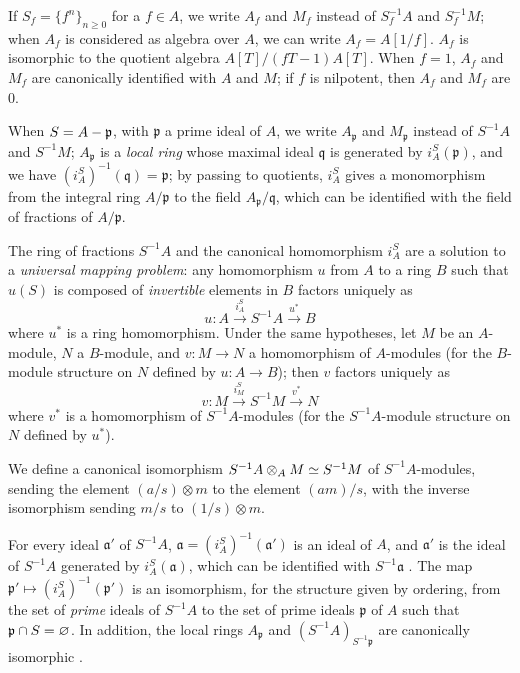 \begin{env}[1.2.3]
\label{0.1.2.3}
If $S_f=\{f^n\}_{n\geq 0}$ for a $f\in A$, we write $A_f$ and $M_f$ instead
of $S_f^{-1}A$ and $S_f^{-1}M$; when $A_f$ is considered as algebra over $A$, we
can write $A_f=A[1/f]$. $A_f$ is isomorphic to the quotient algebra
$A[T]/(fT-1)A[T]$. When $f=1$, $A_f$ and $M_f$ are canonically identified with $A$ and
$M$; if $f$ is nilpotent, then $A_f$ and $M_f$ are $0$.

When $S=A-\mathfrak{p}$, with $\mathfrak{p}$ a prime ideal of $A$, we write
$A_\mathfrak{p}$ and $M_\mathfrak{p}$ instead of $S^{-1}A$ and $S^{-1}M$;
$A_\mathfrak{p}$ is a \emph{local ring} whose maximal ideal $\mathfrak{q}$ is
generated by $i_A^S(\mathfrak{p})$, and we have
$(i_A^S)^{-1}(\mathfrak{q})=\mathfrak{p}$; by passing to quotients, $i_A^S$
gives a monomorphism from the integral ring $A/\mathfrak{p}$ to the field
$A_\mathfrak{p}/\mathfrak{q}$, which can be identified with the field of fractions of
$A/\mathfrak{p}$.
\end{env}

\begin{env}[1.2.4]
\label{0.1.2.4}
The ring of fractions $S^{-1}A$ and the canonical homomorphism $i_A^S$ are a
solution to a \emph{universal mapping problem}: any homomorphism $u$ from $A$ to
a ring $B$ such that $u(S)$ is composed of \emph{invertible} elements in $B$
factors uniquely as
\[
  u:A\xrightarrow{i_A^S}S^{-1}A\xrightarrow{u^*}B
\]
where
$u^*$ is a ring homomorphism.
Under the same hypotheses, let $M$ be an $A$-module, $N$ a $B$-module, and $v:M\to N$ a homomorphism of $A$-modules (for the $B$-module structure on $N$ defined by $u:A\to B$); then $v$ factors uniquely as
\[
  v:M\xrightarrow{i_M^S}S^{-1}M\xrightarrow{v^*}N
\]
where $v^*$ is a homomorphism of $S^{-1}A$-modules (for the $S^{-1}A$-module structure on $N$ defined by $u^*$).
\end{env}

\begin{env}[1.2.5]
\label{0.1.2.5}
We define a canonical isomorphism $S^{-1}A\otimes_A M\simeq S^{-1}M$ of $S^{-1}A$-modules, sending the element $(a/s)\otimes m$ to the element $(am)/s$, with the inverse isomorphism sending $m/s$ to $(1/s)\otimes m$.
\end{env}

\begin{env}[1.2.6]
\label{0.1.2.6}
For every ideal $\mathfrak{a}'$ of $S^{-1}A$, $\mathfrak{a}=(i_A^S)^{-1}(\mathfrak{a}')$ is an ideal of $A$, and
$\mathfrak{a}'$ is the ideal of $S^{-1}A$ generated by $i_A^S(\mathfrak{a})$,
which can be identified with $S^{-1}\mathfrak{a}$ . The map
$\mathfrak{p}'\mapsto(i_A^S)^{-1}(\mathfrak{p}')$ is an isomorphism, for the structure given by ordering, from the set of \emph{prime} ideals of $S^{-1}A$ to the set of
prime ideals $\mathfrak{p}$ of $A$ such that $\mathfrak{p}\cap S=\varnothing$. In
addition, the local rings $A_\mathfrak{p}$ and $(S^{-1}A)_{S^{-1}\mathfrak{p}}$
are canonically isomorphic .
\end{env}

